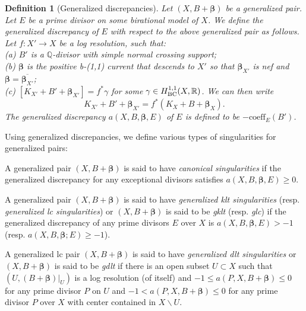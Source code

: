 \documentclass[12pt]{amsart}
\numberwithin{equation}{section}
\theoremstyle{definition}
\theoremstyle{plain}
\newtheorem{definition}  [theorem]     {Definition}
\newtheorem*{thm A*}{Theorem A}
\newtheorem*{thm B*}{Theorem B}
\newtheorem*{thm C*}{Theorem C}
\newtheorem*{thm D*}{Theorem D}
\theoremstyle{definition}
\renewcommand{\1}{\mathds{1}}
\newcommand{\bbeta}{\boldsymbol{\beta}}
\renewcommand{\>}{\rightarrow}
\begin{document}
\begin{definition}[Generalized discrepancies]\label{logdiskrep}
Let $\left({X}, {B}+ { \boldsymbol{\beta}}\right)$ be a generalized pair. Let $E$ be a prime divisor on some birational model of ${X}$. We define the {generalized  discrepancy} of $E$ with respect to the above generalized pair as follows. Let $f:X'\to X$ be a log resolution, such that:\\ 
\emph{(a)} $B'$ is a $\mathbb{Q}$-divisor with simple normal crossing support;\\ 
\emph{(b)} $ { \boldsymbol{\beta}}$ is the positive b-(1,1) current that descends to $X'$ so that  $\bbeta _{X'}$ is nef and $\bbeta =\overline { \bbeta _{X'}}$;\\ 
\emph{(c)} $[K_{X'}+ B'+  { {\bbeta}}_{X'}]  =f^* \gamma$ for some $\gamma\in H^{1,1}_{\rm{BC}}(X, \mathbb{R})$. We can then write
$$
{K}_{{X}'}+{B}'+ { {\bbeta}}_{X'}=f^*\left({K}_{{X}}+{B}+ { {\bbeta}_X}\right).
$$
The \emph{generalized discrepancy} $a(X,B, { {\boldsymbol{\beta}}} , E)$ of $E$ is defined to be $-\text{coeff}_E(B')$.
\end{definition}

Using generalized discrepancies, we define various types of singularities for generalized pairs:

A generalized  pair $(X,B +  { { \boldsymbol{\beta}}} )$ is said to have \emph{canonical singularities} if %
the generalized discrepancy for any exceptional divisors satisfies $a(X,B ,  { \boldsymbol{\beta}} , E) \ge 0$. 

A generalized pair $(X,B +  { \boldsymbol{\beta}} )$ is said to have \emph{generalized klt singularities} (resp. \emph{generalized lc singularities}) or $(X,B +  { \boldsymbol{\beta}} )$ is said to be \emph{gklt} (resp. \emph{glc}) if %
the generalized discrepancy of any prime divisors $E$ over $X$ is $a(X,B ,  { \boldsymbol{\beta}} ,E)>-1$ (resp. $a(X,B, { \boldsymbol{\beta}};E)\ge -1$).

A generalized lc pair $(X,B +  { \boldsymbol{\beta}} )$ is said to have \emph{generalized dlt singularities} or $(X,B +  { \boldsymbol{\beta}} )$ is said to be \emph{gdlt} if there is an open subset $U \subset X$ such that $\left(U,\left.(B+\boldsymbol{\beta})\right|_U\right)$ is a log resolution (of itself) and $-1 \leq a(P, X, B+\boldsymbol{\beta}) \leq 0$ for any prime divisor $P$ on $U$ and $-1<a(P, X, B+\boldsymbol{\beta}) \leq 0$ for any prime divisor $P$ over $X$ with center contained in $X \backslash U$.
\end{document}
